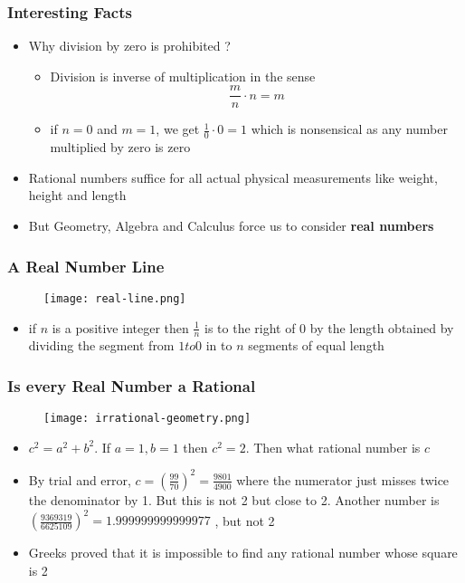 \begin{frame}
    \frametitle{Interesting Facts}
    \begin{itemize} 
        \item Why division by zero is prohibited ?
        \begin{itemize}
            \item Division is inverse of multiplication in the sense  
            \[  
            \frac{m}{n} \cdot n = m
            \]
        \item if \( n=0 \) and \( m = 1\), we get \(\frac{1}{0} \cdot 0 = 1\) which is nonsensical as any number multiplied by zero is zero
        \end{itemize}
        \item Rational numbers suffice for all actual physical measurements like weight, height and length
        \item But Geometry, Algebra and Calculus force us to consider \textbf{real numbers}
    \end{itemize}
\end{frame}
\begin{frame}
    \frametitle{A Real Number Line}
    \begin{figure}[h]    
        \begin{minipage}[b]{0.8\textwidth}
        \centering
        \texttt{[image: real-line.png]}
    \end{minipage}
\end{figure}
\begin{itemize}
    \item if \( n\) is a positive integer then \( \frac{1}{n}\) is to the right of 0 by the length obtained by dividing the segment from \( 1 to 0\) in to \( n \) segments of equal length
\end{itemize}
\end{frame}
\begin{frame}
    \frametitle{Is every Real Number a Rational}
    \begin{figure}[h]    
        \begin{minipage}[b]{0.8\textwidth}
        \centering
        \texttt{[image: irrational-geometry.png]}
        \end{minipage}
    \end{figure}
    \begin{itemize}
        \item \( c^{2} = a^{2} + b^{2} \). If \( a = 1, b = 1\) then \(c^{2} = 2 \). Then what rational number is \( c \)
        \item By trial and error, \( c = \left( \frac{99}{70} \right)^{2}  = \frac{9801}{4900}\) where the numerator just misses twice the denominator by 1. But this is not 2 but close to 2. Another number is \( \left( \frac{9369319}{6625109} \right)^{2} = 1.999999999999977\) , but not 2
        \item Greeks proved that it is impossible to find any rational number whose square is 2
    \end{itemize} 
\end{frame}
